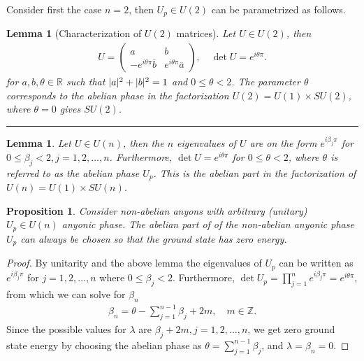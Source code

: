 \documentclass[a4paper,10pt,oneside]{book}
\theoremstyle{plain}
\newtheorem{proposition}[theorem]{Proposition}
\newtheorem{lemma}[theorem]{Lemma}
\theoremstyle{definition}
\theoremstyle{remark}
\DeclarePairedDelimiter\abs{\lvert}{\rvert}
\begin{document}
{Consider first the case $n=2$, then $U_p \in U(2)$ can be parametrized as follows.

\begin{lemma}[Characterization of $U(2)$ matrices]
  Let $U \in U(2)$, then
  \begin{align*}
    U = \begin{pmatrix} a & b \\ -e^{i\theta\pi}\overline{b} & e^{i\theta\pi} \overline{a} \end{pmatrix}, \quad \operatorname{det} U = e^{i\theta\pi}.
  \end{align*}
  for $a,b,\theta \in \mathbb{R}$ such that $\abs{a}^2 + \abs{b}^2 = 1$ and $0 \le \theta < 2$.
  The parameter $\theta$ corresponds to the abelian phase in the factorization $U(2) = U(1)\times SU(2)$, where $\theta = 0$ gives $SU(2)$.
\end{lemma}

\hrule

\begin{lemma}
  Let $U \in U(n)$, then the $n$ eigenvalues of $U$ are on the form $e^{i\beta_j\pi}$ for $0 \le \beta_j <2, j = 1,2,\ldots,n$. Furthermore, $\det U = e^{i\theta\pi}$ for $0 \le \theta < 2$, where $\theta$ is referred to as the abelian phase $U_p$. This is the abelian part in the factorization of $U(n) = U(1) \times SU(n)$.
\end{lemma}


\begin{proposition}
  Consider non-abelian anyons with arbitrary (unitary) $U_p \in U(n)$ anyonic phase. The abelian part of of the non-abelian anyonic phase $U_p$ can always be chosen so that the ground state has zero energy.
\end{proposition}

\begin{proof}
  By unitarity and the above lemma the eigenvalues of $U_p$ can be written as $e^{i\beta_j\pi}$ for $j=1,2,\ldots,n$ where $0 \le \beta_j < 2$. Furthermore, $\operatorname{det} U_p = \prod_{j=1}^n e^{i\beta_j \pi} = e^{i\theta\pi}$, from which we can solve for $\beta_n$
  \begin{align*}
    \beta_n = \theta - \sum_{j=1}^{n-1} \beta_j + 2m, \quad m \in \mathbb{Z}.
  \end{align*}
  Since the possible values for $\lambda$ are $\beta_j + 2m, j=1,2,\ldots,n$, we get zero ground state energy by choosing the abelian phase as $\theta = \sum_{j=1}^{n-1} \beta_j$, and $\lambda = \beta_n = 0$.
\end{proof}

}
\end{document}
